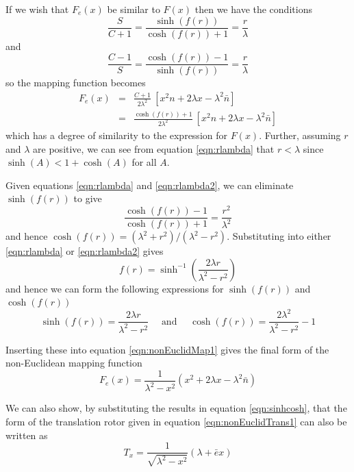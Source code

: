 If we wish that $F_e(x)$ be similar to $F(x)$ then we have the conditions
\begin{equation}
\frac{S}{C + 1} = \frac{\sinh(f(r))}{\cosh(f(r)) + 1} = \frac{r}{\lambda}
\label{eqn:rlambda}
\end{equation}
and
\begin{equation}
\frac{C-1}{S} = \frac{\cosh(f(r)) - 1}{\sinh(f(r))} = \frac{r}{\lambda}
\label{eqn:rlambda2}
\end{equation}
so the mapping function becomes
\begin{eqnarray}
F_e(x) &=& \frac{C+1}{2\lambda^2}\ [x^2n + 2\lambda x - \lambda^2 \bar{n}] \\
&=& \frac{\cosh(f(r)) + 1}{2\lambda^2}\ [x^2n + 2\lambda x - \lambda^2 \bar{n}]
\end{eqnarray}
which has a degree of similarity to the expression for $F(x)$. Further, 
assuming $r$ and $\lambda$ are positive, we can see from equation
\ref{eqn:rlambda} that $r < \lambda$ since $\sinh(A) < 1 + \cosh(A)$
for all $A$.

Given equations \ref{eqn:rlambda} and \ref{eqn:rlambda2}, we can eliminate
$\sinh(f(r))$ to give
\begin{equation}
\frac{\cosh(f(r)) -1}{\cosh(f(r)) + 1} = \frac{r^2}{\lambda^2}
\end{equation}
and hence $\cosh(f(r)) = (\lambda^2 + r^2)/(\lambda^2 - r^2)$. Substituting
into either \ref{eqn:rlambda} or \ref{eqn:rlambda2} gives
\begin{equation}
f(r) = \sinh^{-1}\left( \frac{2\lambda r}{\lambda^2 - r^2} \right)
\end{equation}
and hence we can form the following expressions for 
$\sinh(f(r))$ and $\cosh(f(r))$
\begin{equation}
\sinh(f(r)) = \frac{2\lambda r}{\lambda^2 - r^2} \quad \mbox{ and } \quad
\cosh(f(r)) = \frac{2\lambda^2}{\lambda^2 - r^2} - 1
\end{equation}

Inserting these into equation \ref{eqn:nonEuclidMap1} gives the final form
of the non-Euclidean mapping function
\begin{equation}
F_e(x) = \frac{1}{\lambda^2 - x^2}(x^2 + 2\lambda x - \lambda^2\bar{n})
\label{eqn:nonEuclidMapping}
\end{equation}

We can also show, by substituting the results in equation \ref{eqn:sinhcosh}, 
that the form of the translation rotor given in 
equation \ref{eqn:nonEuclidTrans1} can also be written as
\begin{equation}
T_x = \frac{1}{\sqrt{\lambda^2 - x^2}}(\lambda + \bar{e}x)
\label{eqn:transrotor}
\end{equation}

